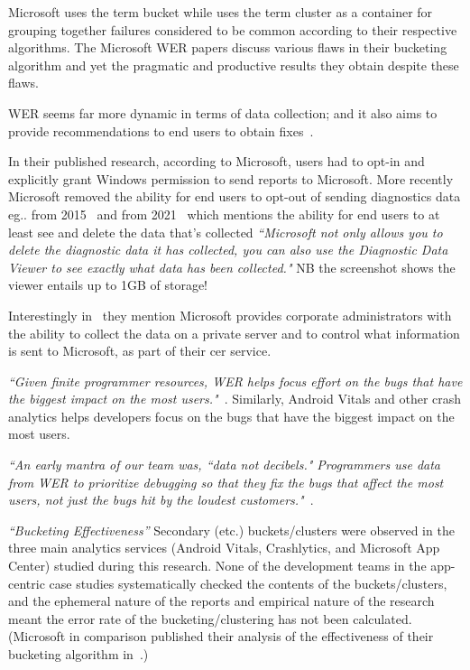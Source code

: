 Microsoft uses the term bucket while  uses the term cluster as a container for grouping together failures considered to be common according to their respective algorithms. The Microsoft WER papers discuss various flaws in their bucketing algorithm and yet the pragmatic and productive results they obtain despite these flaws.

WER seems far more dynamic in terms of data collection; and it also aims to provide recommendations to end users to obtain fixes~.

In their published research, according to Microsoft, users had to opt-in and explicitly grant Windows permission to send reports to Microsoft. More recently Microsoft removed the ability for end users to opt-out of sending diagnostics data eg.. from 2015~ and from 2021~ which mentions the ability for end users to at least see and delete the data that's collected \emph{``Microsoft not only allows you to delete the diagnostic data it has collected, you can also use the Diagnostic Data Viewer to see exactly what data has been collected."} NB the screenshot shows the viewer entails up to 1GB of storage!

Interestingly in~ they mention Microsoft provides corporate administrators with the ability to collect the data on a private server and to control what information is sent to Microsoft, as part of their \acrfull{cer} service.



\emph{``Given finite programmer resources, WER helps focus effort on the bugs that have the biggest impact on the most users."}~. Similarly, Android Vitals and other crash analytics helps developers focus on the bugs that have the biggest impact on the most users.


\emph{``An early mantra of our team was, ``data not decibels." Programmers use data from WER to prioritize debugging so that they fix the bugs that affect the most users, not just the bugs hit by
the loudest customers."}~. 


\emph{``Bucketing Effectiveness''} Secondary (etc.) buckets/clusters were observed in the three main analytics services (Android Vitals, Crashlytics, and Microsoft App Center) studied during this research. None of the development teams in the app-centric case studies systematically checked the contents of the buckets/clusters, and the ephemeral nature of the reports and empirical nature of the research meant the error rate of the bucketing/clustering has not been calculated. (Microsoft in comparison published their analysis of the effectiveness of their bucketing algorithm in~.) 

